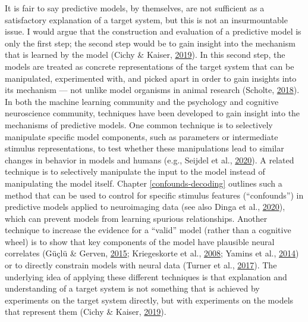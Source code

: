 \documentclass[12pt,american,a4paper,oneside,]{memoir} %
\begin{document}
It is fair to say predictive models, by themselves, are not sufficient as a satisfactory explanation of a target system, but this is not an insurmountable issue. I would argue that the construction and evaluation of a predictive model is only the first step; the second step would be to gain insight into the mechanism that is learned by the model (Cichy \& Kaiser, \protect\hyperlink{ref-Cichy2019-zf}{2019}). In this second step, the models are treated as concrete representations of the target system that can be manipulated, experimented with, and picked apart in order to gain insights into its mechanism --- not unlike model organisms in animal research (Scholte, \protect\hyperlink{ref-Scholte2018-he}{2018}). In both the machine learning community and the psychology and cognitive neuroscience community, techniques have been developed to gain insight into the mechanisms of predictive models. One common technique is to selectively manipulate specific model components, such as parameters or intermediate stimulus representations, to test whether these manipulations lead to similar changes in behavior in models and humans (e.g., Seijdel et al., \protect\hyperlink{ref-Seijdel2020-ff}{2020}). A related technique is to selectively manipulate the input to the model instead of manipulating the model itself. Chapter \ref{confounds-decoding} outlines such a method that can be used to control for specific stimulus features (``confounds'') in predictive models applied to neuroimaging data (see also Dinga et al., \protect\hyperlink{ref-Dinga2020-si}{2020}), which can prevent models from learning spurious relationships. Another technique to increase the evidence for a ``valid'' model (rather than a cognitive wheel) is to show that key components of the model have plausible neural correlates (Güçlü \& Gerven, \protect\hyperlink{ref-Guclu2015-qj}{2015}; Kriegeskorte et al., \protect\hyperlink{ref-kriegeskorte2008representational}{2008}; Yamins et al., \protect\hyperlink{ref-yamins2014performance}{2014}) or to directly constrain models with neural data (Turner et al., \protect\hyperlink{ref-Turner2017-fi}{2017}). The underlying idea of applying these different techniques is that explanation and understanding of a target system is not something that is achieved by experiments on the target system directly, but with experiments on the models that represent them (Cichy \& Kaiser, \protect\hyperlink{ref-Cichy2019-zf}{2019}).
\end{document}
